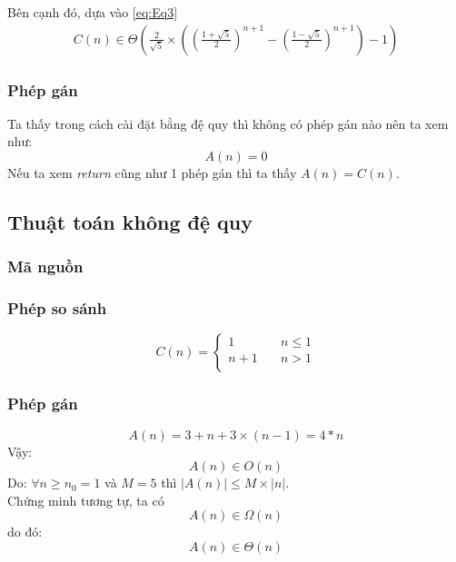 \documentclass{article}
\begin{document}
\begin{flushleft}
Bên cạnh đó, dựa vào \ref{eq:Eq3}
\begin{gather}
	C(n) \in \Theta \left( \frac{2}{\sqrt{5}}  \times \left( \left( \frac{1+\sqrt{5}}{2} \right) ^{n+1} - \left( \frac{1-\sqrt{5}}{2} \right) ^{n+1} \right)-1 \right) 
\end{gather}
\end{flushleft}

\subsubsection{Phép gán}
\begin{flushleft}
Ta thấy trong cách cài đặt bằng đệ quy thì không có phép gán nào nên ta xem như:
\begin{equation}
A(n) = 0
\end{equation}
Nếu ta xem \emph{return} cũng như 1 phép gán thì ta thấy $A(n) = C(n)$.
\end{flushleft}
\subsection{Thuật toán không đệ quy}
\subsubsection{Mã nguồn}

\subsubsection{Phép so sánh}
\begin{equation}
C(n) = 
\begin{cases}
1 & \quad n \leq 1\\
n+1 & \quad n > 1\\
\end{cases}
\end{equation}
\subsubsection{Phép gán}
\begin{equation}
A(n) =  3 + n + 3 \times (n-1) = 4*n
\end{equation}
Vậy: 
\begin{equation}
	A(n) \in O(n)
\end{equation}
Do: $\forall n \geq n_{0} = 1$ và $M = 5$ thì $|A(n)| \leq M \times |n|$.\\
Chứng minh tương tự, ta có
\begin{equation}
	A(n) \in \Omega (n)
\end{equation}
do đó:
\begin{equation}
	A(n) \in \Theta (n)
\end{equation}
\end{document}
